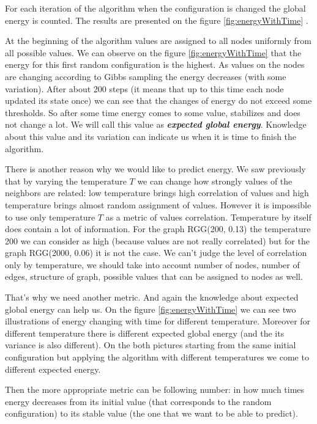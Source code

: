 \documentclass[12pt]{report}
\begin{document}
For each iteration of the algorithm when the configuration is changed the global energy is counted. The results are presented on the figure \ref{fig:energyWithTime} .


At the beginning of the algorithm values are assigned to all nodes uniformly from all possible values. We can observe on the figure \ref{fig:energyWithTime} that the energy for this first random configuration is the highest. As values on the nodes are changing according to Gibbs sampling the energy decreases (with some variation). After about 200 steps (it means that up to this time each node updated its state once) we can see that the changes of energy do not exceed some thresholds. So after some time energy comes to some value, stabilizes and does not change a lot. We will call this value as \textbf{\textit{expected global energy}}. Knowledge about this value and its variation can indicate us when it is time to finish the algorithm. 
 
 

There is another reason why we would like to predict energy.
We saw previously that by varying the temperature $T$ we can change how strongly values of the neighbors are related: low temperature brings high correlation of values and high temperature brings almost random assignment of values. However it is impossible to use only temperature $T$ as a metric of values correlation. Temperature by itself does contain a lot of information. For the graph RGG(200, 0.13) the temperature 200 we can consider as high (because values are not really correlated) but for the graph RGG(2000, 0.06) it is not the case. We can't judge the level of correlation only by temperature, we should take into account number of nodes, number of edges, structure of graph, possible values that can be assigned to nodes as well. 


That's why we need another metric. And again the knowledge about expected global energy can help us. On the figure \ref{fig:energyWithTime} we can see two illustrations of energy changing with time for different temperature. Moreover for different temperature there is different expected global energy (and the its variance is also different). On the both pictures starting from the same initial configuration but applying the algorithm with different temperatures we come to different expected energy.

Then the more appropriate metric can be following number: in how much times energy decreases from its initial value (that corresponds to the random configuration) to its stable value (the one that we want to be able to predict).
\end{document}
